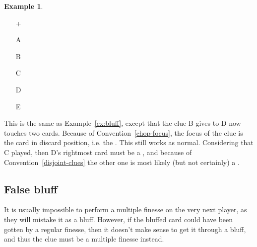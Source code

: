 \documentclass[a4paper]{article}
\theoremstyle{plain}
\theoremstyle{definition}
\newtheorem{example}[theorem]{Example}
\begin{document}
\begin{example}	\hfill \\
	\begin{minipage}{0.45\textwidth}
		\begin{itemize}
			\item[\Large +]      
			\item[\Large A]    
			\item[\Large B]    
			\item[\Large C]    
			\item[\Large D]    
			\item[\Large E]    
		\end{itemize}
	\end{minipage}%
	\begin{minipage}{0.55\textwidth}
		This is the same as Example~\ref{ex:bluff}, except that the  clue B gives to D now touches two cards. Because of Convention~\ref{chop-focus}, the focus of the clue is the card in discard position, i.e. the . This still works as normal. Considering that C played, then D's rightmost card must be a , and because of Convention~\ref{disjoint-clues} the other one is most likely (but not certainly) a .
	\end{minipage}
\end{example} \vspace{0.15 cm}

\subsection{False bluff}

It is usually impossible to perform a multiple finesse on the very next player, as they will mistake it as a bluff. However, if the bluffed card could have been gotten by a regular finesse, then it doesn't make sense to get it through a bluff, and thus the clue must be a multiple finesse instead.
\end{document}
